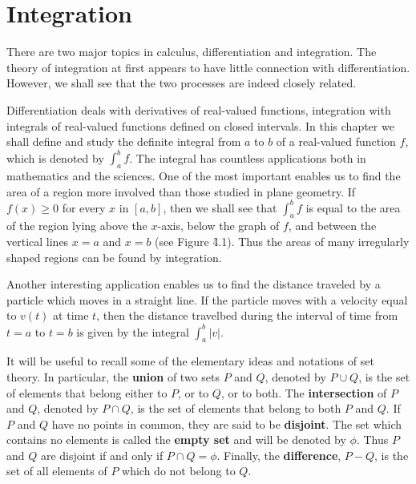 \chapter{Integration}\label{chp 4}

There are two major topics in calculus, differentiation and integration. The theory of integration at first appears to have little connection with differentiation. However, we shall see that the two processes are indeed closely related.

Differentiation deals with derivatives of real-valued functions, integration with integrals of real-valued functions defined on closed intervals. In this chapter we shall define and study the definite integral from $a$ to $b$ of a real-valued function $f$, which is denoted by $\int_{a}^{b} f$. The integral has countless applications both in mathematics and the sciences. One of the most important 
enables us to find the area of a region more involved than those studied in plane geometry. If $f(x) \geq 0$ for every $x$ in $[a, b]$, then we shall see that $\int_{a}^{b} f$ is equal to the area of the region lying above the $x$-axis, below the graph of $f$, and between the vertical lines $x = a$ and $x = b$ (see Figure \f{4.1}). Thus the areas of many irregularly shaped regions can be found by integration.


Another interesting application enables us to find the distance traveled by a particle which moves in a straight line. If the particle moves with a velocity equal to $v(t)$ at time $t$, then the distance travelbed during the interval of time from $t = a$ to $t = b$ is given by the integral $\int_{a}^{b} |v|$.

It will be useful to recall some of the elementary ideas and notations of set theory. In particular, the \textbf{union} of two sets $P$ and $Q$, denoted by $P \cup Q$, is the set of elements that belong either to $P$,  or to $Q$, or to both. The \textbf{intersection}
of $P$ and $Q$, denoted by $P \cap Q$, is the set of elements that belong to both $P$ and $Q$. If $P$ and $Q$ have no points in common, they are said to be \textbf{disjoint}. The set which contains no elements is called the
\textbf{empty set} and will be denoted by $\phi$. Thus $P$ and $Q$ are disjoint if and only if $P \cap Q = \phi$.  Finally, the \textbf{difference}, $P - Q$, is the set of all elements of $P$ which do not belong to $Q$.

